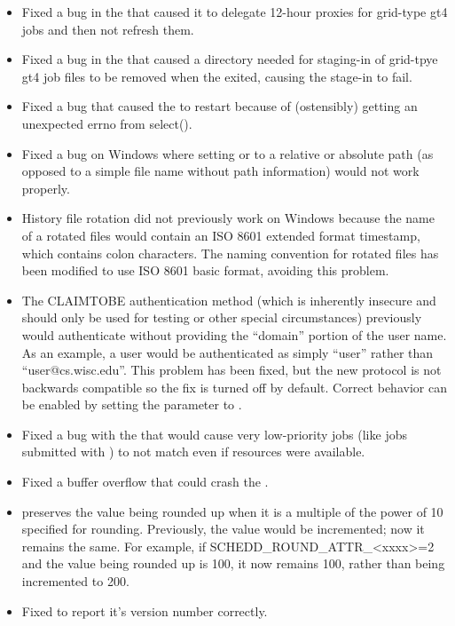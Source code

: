 \begin{itemize}
\item Fixed a bug in the  that caused it to delegate
12-hour proxies for grid-type gt4 jobs and then not refresh them.

\item Fixed a bug in the  that caused a directory
needed for staging-in of grid-tpye gt4 job files to be removed when
the  exited, causing the stage-in to fail.

\item Fixed a bug that caused the  to restart
because of (ostensibly) getting an unexpected errno from select().

\item Fixed a bug on Windows where setting  or
 to a relative or absolute path (as opposed to a
simple file name without path information) would not work properly.

\item History file rotation did not previously work on Windows because
the name of a rotated files would contain an ISO 8601 extended format
timestamp, which contains colon characters. The naming convention for
rotated files has been modified to use ISO 8601 basic format, avoiding
this problem.

\item The CLAIMTOBE authentication method (which is inherently
insecure and should only be used for testing or other special
circumstances) previously would authenticate without providing the
``domain'' portion of the user name. As an example, a user would be
authenticated as simply ``user'' rather than
``user@cs.wisc.edu''. This problem has been fixed, but the new
protocol is not backwards compatible so the fix is turned off by
default. Correct behavior can be enabled by setting the
 parameter to .

\item Fixed a bug with the  that
would cause very low-priority jobs (like jobs submitted with
) to not match even if resources were available.

\item Fixed a buffer overflow that could crash the .

\item {} preserves the value being
rounded up when it is a multiple of the power of 10 specified for
rounding.  Previously, the value would be incremented; now it remains
the same.  For example, if SCHEDD\_ROUND\_ATTR\_<xxxx>=2 and the value
being rounded up is 100, it now remains 100, rather than being
incremented to 200.

\item Fixed  to report it's version number
correctly.

\end{itemize}

